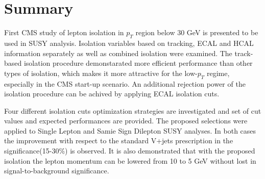 \section{Summary}
\label{sec:Summary}

First CMS study of lepton isolation in $p_T$ region below 30 GeV is 
presented
to be used in SUSY analysis. Isolation variables based on tracking, ECAL 
and
HCAL information separately as well as combined isolation were examined.
The track-based isolation procedure demonstarated more efficient 
performance than
other types of isolation, which makes it more attractive for the low-$p_T$ 
regime,
especially in the CMS start-up scenario. An additional rejection power
of the isolation procedure can be achived by applying ECAL isolation cuts.

Four different isolation cuts optimization strategies are investigated
and set of cut values and expected performances are provided.
The proposed selections were applied to Single Lepton and Samie Sign 
Dilepton SUSY analyses. In both cases the improvement with respect to the 
standard V+jets prescription
in the significance(15-30\%) is observed.
It is also demonstrated that with the proposed isolation
the lepton momentum can be lowered from 10 to 5 GeV without lost  in 
signal-to-background significance.
